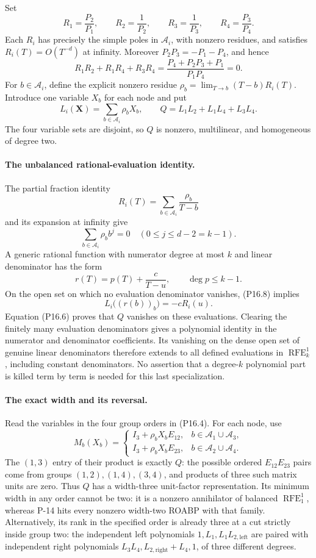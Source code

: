 Set
\[
 R_1=\frac{P_2}{P_1},\qquad R_2=\frac1{P_2},\qquad
 R_3=\frac1{P_3},\qquad R_4=\frac{P_3}{P_4}.
 \tag{P16.5}
\]
Each $R_i$ has precisely the simple poles in $\mathcal A_i$, with
nonzero residues, and satisfies $R_i(T)=O(T^{-d})$ at infinity.
Moreover $P_2P_3=-P_1-P_4$, and hence
\[
 R_1R_2+R_1R_4+R_3R_4
 =\frac{P_4+P_2P_3+P_1}{P_1P_4}=0.
 \tag{P16.6}
\]
For $b\in\mathcal A_i$, define the explicit nonzero residue
$\rho_b=\lim_{T\to b}(T-b)R_i(T)$. Introduce one variable $X_b$ for
each node and put
\[
 L_i(\mathbf X)=\sum_{b\in\mathcal A_i}\rho_bX_b,
 \qquad
 Q=L_1L_2+L_1L_4+L_3L_4.
 \tag{P16.7}
\]
The four variable sets are disjoint, so $Q$ is nonzero, multilinear,
and homogeneous of degree two.

\paragraph{The unbalanced rational-evaluation identity.}
The partial fraction identity
\[
 R_i(T)=\sum_{b\in\mathcal A_i}\frac{\rho_b}{T-b}
\]
and its expansion at infinity give
\[
 \sum_{b\in\mathcal A_i}\rho_b b^j=0
       \quad(0\le j\le d-2=k-1).
 \tag{P16.8}
\]
A generic rational function with numerator degree at most $k$ and
linear denominator has the form
\[
 r(T)=p(T)+\frac{c}{T-u},\qquad \deg p\le k-1.
\]
On the open set on which no evaluation denominator vanishes,
(P16.8) implies
\[
 L_i\bigl((r(b))_b\bigr)=-cR_i(u).
\]
Equation (P16.6) proves that $Q$ vanishes on these evaluations.
Clearing the finitely many evaluation denominators gives a polynomial
identity in the numerator and denominator coefficients. Its vanishing
on the dense open set of genuine linear denominators therefore extends
to all defined evaluations in $\operatorname{RFE}_{k}^{1}$, including
constant denominators. No assertion that a degree-$k$ polynomial part
is killed term by term is needed for this last specialization.

\paragraph{The exact width and its reversal.}
Read the variables in the four group orders in (P16.4). For each node,
use
\[
 M_b(X_b)=
 \begin{cases}
 I_3+\rho_bX_bE_{12},&b\in\mathcal A_1\cup\mathcal A_3,\\
 I_3+\rho_bX_bE_{23},&b\in\mathcal A_2\cup\mathcal A_4.
 \end{cases}
 \tag{P16.9}
\]
The $(1,3)$ entry of their product is exactly $Q$: the possible
ordered $E_{12}E_{23}$ pairs come from groups $(1,2),(1,4),(3,4)$,
and products of three such matrix units are zero. Thus $Q$ has a
width-three unit-factor representation. Its minimum width in any
order cannot be two: it is a nonzero annihilator of balanced
$\operatorname{RFE}_{1}^{1}$, whereas P-14 hits every nonzero
width-two ROABP with that family. Alternatively, its rank in the
specified order is already three at a cut strictly inside group two:
the independent left polynomials $1,L_1,L_1L_{2,\mathrm{left}}$
are paired with independent right polynomials
$L_3L_4,L_{2,\mathrm{right}}+L_4,1$, of three different degrees.


